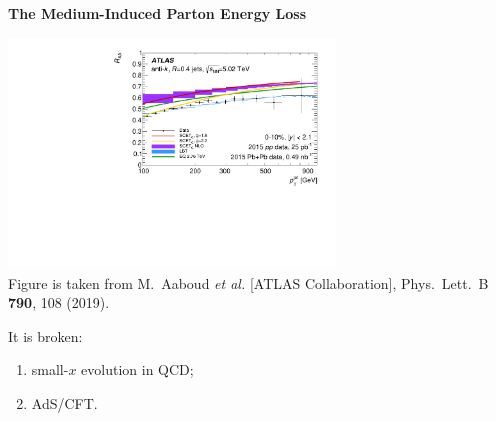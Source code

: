 \documentclass[9pt,a4paper,unknownkeysallowed,xcolor=dvipsnames,aspectratio=43]{beamer}
\begin{document}
%
%
\begin{frame}{\bf\huge The Medium-Induced Parton Energy Loss}	\vspace{4mm}
\begin{center}
\includegraphics[width=0.65\textwidth]{fig/RAA_jet}\\
{\tiny  Figure is taken from {\color{teablue}
M.~Aaboud {\it et al.} [ATLAS Collaboration],
  Phys.\ Lett.\ B {\bf 790}, 108 (2019).
  }}
\end{center}
\vspace{4mm}
{\large It is broken:}
\vspace{2mm}
\begin{enumerate}
\item{small-$x$ evolution in QCD;}
\vspace{4mm}
\item{AdS/CFT.}
\end{enumerate}
\end{frame}
%
%
\end{document}

